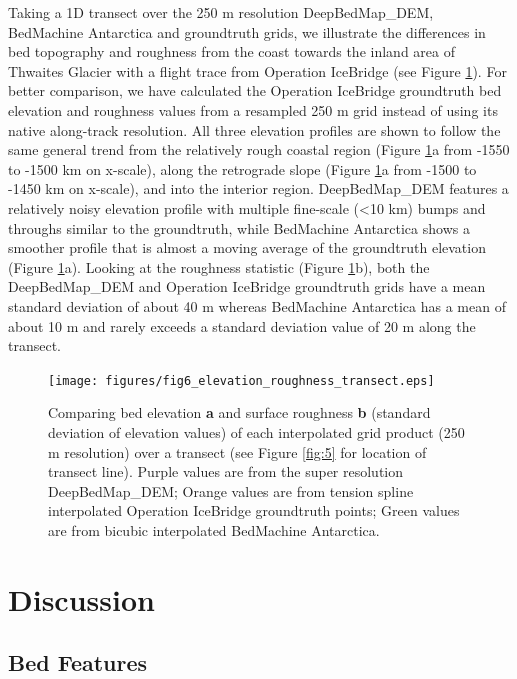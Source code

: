 \documentclass[tc, manuscript]{copernicus}
\begin{document}
Taking a 1D transect over the 250 m resolution DeepBedMap\_DEM, BedMachine Antarctica and groundtruth grids, we illustrate the differences in bed topography and roughness from the coast towards the inland area of Thwaites Glacier with a flight trace from Operation IceBridge (see Figure \ref{fig:6}).
For better comparison, we have calculated the Operation IceBridge groundtruth bed elevation and roughness values from a resampled 250 m grid instead of using its native along-track resolution.
All three elevation profiles are shown to follow the same general trend from the relatively rough coastal region (Figure \ref{fig:6}a from -1550 to -1500 km on x-scale), along the retrograde slope (Figure \ref{fig:6}a from -1500 to -1450 km on x-scale), and into the interior region.
DeepBedMap\_DEM features a relatively noisy elevation profile with multiple fine-scale (<10 km) bumps and throughs similar to the groundtruth, while BedMachine Antarctica shows a smoother profile that is almost a moving average of the groundtruth elevation (Figure \ref{fig:6}a).
Looking at the roughness statistic (Figure \ref{fig:6}b), both the DeepBedMap\_DEM and Operation IceBridge groundtruth grids have a mean standard deviation of about 40 m whereas BedMachine Antarctica has a mean of about 10 m and rarely exceeds a standard deviation value of 20 m along the transect.

\begin{figure}[htbp]
  \texttt{[image: figures/fig6\_elevation\_roughness\_transect.eps]}
  \caption{
    Comparing bed elevation \textbf{a} and surface roughness \textbf{b} (standard deviation of elevation values) of each interpolated grid product (250 m resolution) over a transect (see Figure \ref{fig:5} for location of transect line).
    Purple values are from the super resolution DeepBedMap\_DEM;
    Orange values are from tension spline interpolated Operation IceBridge groundtruth points;
    Green values are from bicubic interpolated BedMachine Antarctica.
  }
  \label{fig:6}
\end{figure}


\section{Discussion}

\subsection{Bed Features}
\end{document}
